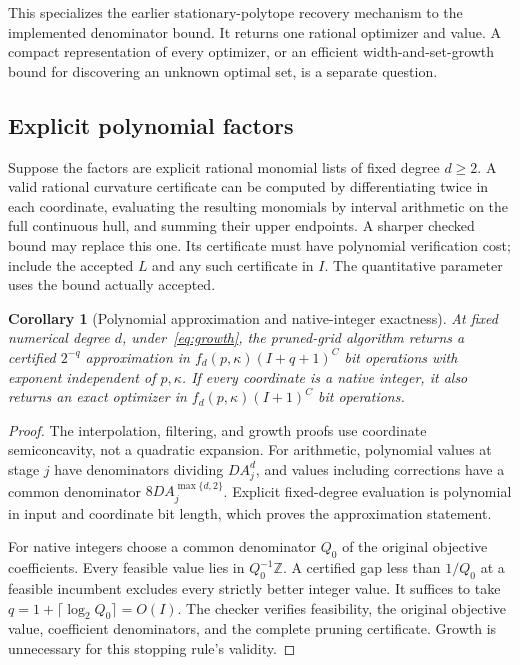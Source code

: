 \documentclass[11pt]{article}
\newtheorem{corollary}[theorem]{Corollary}
\theoremstyle{remark}
\newcommand{\Z}{\mathbb Z}
\begin{document}
This specializes the earlier stationary-polytope recovery mechanism to
the implemented denominator bound. It returns one rational optimizer
and value. A compact representation of every optimizer, or an efficient
width-and-set-growth bound for discovering an unknown optimal set, is
a separate question.

\subsection{Explicit polynomial factors}\label{sec:polynomial}

Suppose the factors are explicit rational monomial lists of fixed degree
$d\ge2$. A valid rational curvature certificate can be computed by
differentiating twice in each coordinate, evaluating the resulting
monomials by interval arithmetic on the full continuous hull, and summing
their upper endpoints. A sharper checked bound may replace this one.
Its certificate must have polynomial verification cost; include the
accepted $L$ and any such certificate in $I$. The quantitative parameter
uses the bound actually accepted.

\begin{corollary}[Polynomial approximation and native-integer exactness]
At fixed numerical degree $d$, under~\eqref{eq:growth}, the pruned-grid
algorithm returns a certified $2^{-q}$ approximation in
$f_d(p,\kappa)(I+q+1)^C$ bit operations with exponent independent of
$p,\kappa$. If every coordinate is a native integer, it also returns an
exact optimizer in $f_d(p,\kappa)(I+1)^C$ bit operations.
\end{corollary}
\begin{proof}
The interpolation, filtering, and growth proofs use coordinate
semiconcavity, not a quadratic expansion. For arithmetic, polynomial
values at stage $j$ have denominators dividing $DA_j^d$, and values
including corrections have a common denominator $8DA_j^{\max\{d,2\}}$.
Explicit fixed-degree evaluation is polynomial in input and coordinate
bit length, which proves the approximation statement.

For native integers choose a common denominator $Q_0$ of the original
objective coefficients. Every feasible value lies in $Q_0^{-1}\Z$.
A certified gap less than $1/Q_0$ at a feasible incumbent excludes every
strictly better integer value. It suffices to take
$q=1+\lceil\log_2Q_0\rceil=O(I)$. The checker verifies feasibility,
the original objective value, coefficient denominators, and the complete
pruning certificate. Growth is unnecessary for this stopping rule's
validity.
\end{proof}
\end{document}
